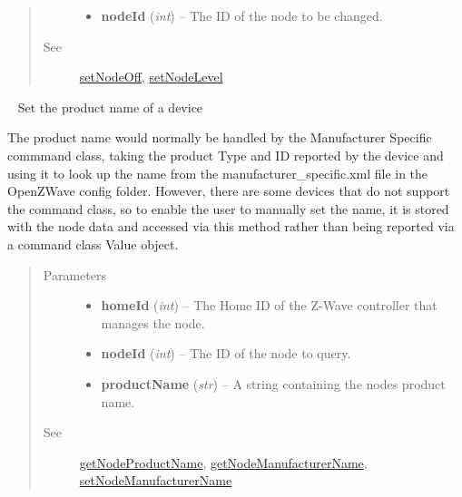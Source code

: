 \documentclass[letterpaper,10pt,english]{sphinxmanual}
\begin{document}
\begin{fulllineitems}
\begin{fulllineitems}
\begin{quote}
\begin{description}
\begin{itemize}
\item {} 
\textbf{nodeId} (\emph{int}) -- The ID of the node to be changed.

\end{itemize}

\item[{See}] \leavevmode
{\hyperref[libopenzwave:setnodeoff]{setNodeOff}}, {\hyperref[libopenzwave:setnodelevel]{setNodeLevel}}

\end{description}\end{quote}

\end{fulllineitems}


\begin{fulllineitems}
\label{libopenzwave:libopenzwave.PyManager.setNodeProductName}~\label{libopenzwave:setnodeproductname}
Set the product name of a device

The product name would normally be handled by the Manufacturer Specific
commmand class, taking the product Type and ID reported by the device and using
it to look up the name from the manufacturer\_specific.xml file in the OpenZWave
config folder.  However, there are some devices that do not support the command
class, so to enable the user to manually set the name, it is stored with the
node data and accessed via this method rather than being reported via a command
class Value object.
\begin{quote}\begin{description}
\item[{Parameters}] \leavevmode\begin{itemize}
\item {} 
\textbf{homeId} (\emph{int}) -- The Home ID of the Z-Wave controller that manages the node.

\item {} 
\textbf{nodeId} (\emph{int}) -- The ID of the node to query.

\item {} 
\textbf{productName} (\emph{str}) -- A string containing the nodes product name.

\end{itemize}

\item[{See}] \leavevmode
{\hyperref[libopenzwave:getnodeproductname]{getNodeProductName}}, {\hyperref[libopenzwave:getnodemanufacturername]{getNodeManufacturerName}}, {\hyperref[libopenzwave:setnodemanufacturername]{setNodeManufacturerName}}


\end{description}
\end{quote}
\end{fulllineitems}
\end{fulllineitems}
\end{document}
